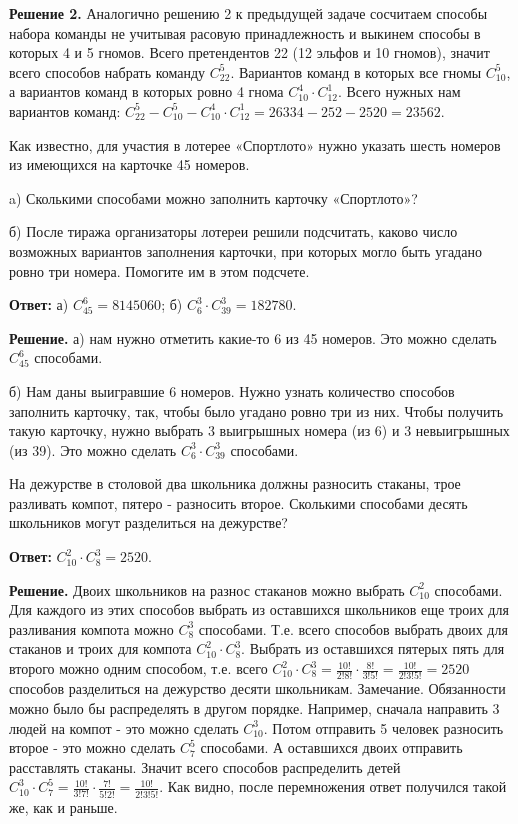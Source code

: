 \textbf{Решение 2.}
Аналогично решению 2 к предыдущей задаче сосчитаем способы набора команды не учитывая расовую принадлежность и выкинем способы в которых 4 и 5 гномов. Всего претендентов 22 (12 эльфов и 10 гномов), значит всего способов набрать команду $C_{22}^5$. Вариантов команд в которых все гномы $C_{10}^5$, а вариантов команд в которых ровно 4 гнома $C_{10}^4 \cdot C_{12}^1$. Всего нужных нам вариантов команд: $C_{22}^5-C_{10}^5-C_{10}^4 \cdot C_{12}^1=26334-252-2520=23562$.

Как известно, для участия в лотерее «Спортлото» нужно указать шесть номеров из имеющихся на карточке 45 номеров.

a) Сколькими способами можно заполнить карточку «Спортлото»?

б) После тиража организаторы лотереи решили подсчитать, каково число возможных вариантов заполнения карточки, при которых могло быть угадано ровно три номера. Помогите им в этом подсчете.


\textbf{Ответ:} а) $C_{45}^6=8145060$; б) $C_6^3 \cdot C_{39}^3=182780$.

\textbf{Решение.} а) нам нужно отметить какие-то 6 из 45 номеров. Это можно сделать $C_{45}^6$ способами.

б) Нам даны выигравшие 6 номеров. Нужно узнать количество способов заполнить карточку, так, чтобы было угадано ровно три из них. Чтобы получить такую карточку, нужно выбрать 3 выигрышных номера (из 6) и 3 невыигрышных (из 39). Это можно сделать $C_6^3 \cdot C_{39}^3$ способами.

На дежурстве в столовой два школьника должны разносить стаканы, трое разливать компот, пятеро - разносить второе. Сколькими способами десять школьников могут разделиться на дежурстве?

\textbf{Ответ:} $C_{10}^2 \cdot C_8^3=2520$.

\textbf{Решение.} Двоих школьников на разнос стаканов можно выбрать $C_{10}^2$ способами. Для каждого из этих способов выбрать из оставшихся школьников еще троих для разливания компота можно $C_8^3$ способами. Т.е. всего способов выбрать двоих для стаканов и троих для компота $C_{10}^2 \cdot C_8^3$. Выбрать из оставшихся пятерых пять для второго можно одним способом, т.е. всего $C_{10}^2 \cdot C_8^3=\frac{10!}{2!8!} \cdot \frac{8!}{3!5!}=\frac{10!}{2!3!5!}=2520 \quad$ способов разделиться на дежурство десяти школьникам.
Замечание. Обязанности можно было бы распределять в другом порядке. Например, сначала направить 3 людей на компот - это можно сделать $C_{10}^3$. Потом отправить 5 человек разносить второе - это можно сделать $C_7^5$ способами. А оставшихся двоих отправить расставлять стаканы. Значит всего способов распределить детей $C_{10}^3 \cdot C_7^5=\frac{10!}{3!7!} \cdot \frac{7!}{5!2!}=\frac{10!}{2!3!5!}$. Как видно, после перемножения ответ получился такой же, как и раньше.

